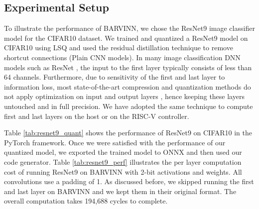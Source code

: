 \documentclass[sigconf]{acmart}
\newcommand{\barvinn}{BARVINN}
\begin{document}



\subsection{Experimental Setup}
\label{sec:pef_neural_barvinn}
To illustrate the performance of \barvinn{}, we chose the ResNet9 image classifier model for the CIFAR10 dataset. We trained and quantized a ResNet9 model on CIFAR10 using LSQ \cite{Esser2020LEARNED} and used the residual distillation \cite{NEURIPS2020_657b96f0} technique to remove shortcut connections (Plain CNN models). In many image classification DNN models such as ResNet \cite{He_2016_CVPR}, the input to the first layer typically consists of less than 64 channels. Furthermore, due to sensitivity of the first and last layer to information loss, most state-of-the-art compression and quantization methods do not apply optimization on input and output layers \cite{Esser2020LEARNED}, hence keeping these layers untouched and in full precision. We have adopted the same technique to compute first and last layers on the host or on the RISC-V controller.

Table \ref{tab:resnet9_quant} shows the performance of ResNet9 on CIFAR10 in the PyTorch framework. Once we were satisfied with the performance of our quantized model, we exported the trained model to ONNX and then used our code generator.
Table \ref{tab:resnet9_perf} illustrates the per layer computation cost of running ResNet9 on \barvinn{} with 2-bit activations and weights. All convolutions use a padding of 1. As discussed before, we skipped running the first and last layer on \barvinn{} and we kept them in their original format. The overall computation takes 194,688 cycles to complete. 
\end{document}
